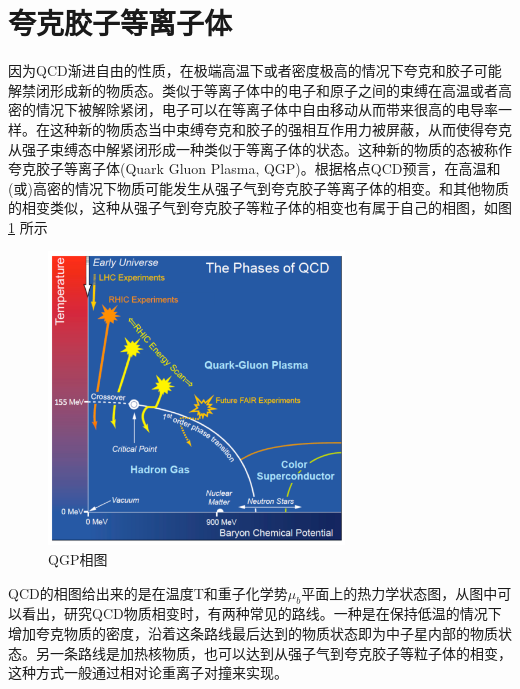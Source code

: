 \section{夸克胶子等离子体}
\label{夸克胶子等离子体}
因为QCD渐进自由的性质，在极端高温下或者密度极高的情况下夸克和胶子可能解禁闭形成新的物质态。类似于等离子体中的电子和原子之间的束缚在高温或者高密的情况下被解除紧闭，电子可以在等离子体中自由移动从而带来很高的电导率一样。在这种新的物质态当中束缚夸克和胶子的强相互作用力被屏蔽，从而使得夸克从强子束缚态中解紧闭形成一种类似于等离子体的状态。这种新的物质的态被称作夸克胶子等离子体(Quark Gluon Plasma, QGP)。根据格点QCD预言，在高温和(或)高密的情况下物质可能发生从强子气到夸克胶子等离子体的相变。和其他物质的相变类似，这种从强子气到夸克胶子等粒子体的相变也有属于自己的相图，如图 \ref{fig:PhaseDiagram} 所示

\begin{figure}[htb]
    \begin{center}
    \includegraphics[width=0.7\textwidth,clip]{figures/Chapter1/PhaseDiagram.png}
    \end{center}
    \caption[QGP相图]{QGP相图}
    \label{fig:PhaseDiagram}
\end{figure}

QCD的相图给出来的是在温度T和重子化学势$\mu_b$平面上的热力学状态图，从图中可以看出，研究QCD物质相变时，有两种常见的路线。一种是在保持低温的情况下增加夸克物质的密度，沿着这条路线最后达到的物质状态即为中子星内部的物质状态。另一条路线是加热核物质，也可以达到从强子气到夸克胶子等粒子体的相变，这种方式一般通过相对论重离子对撞来实现。